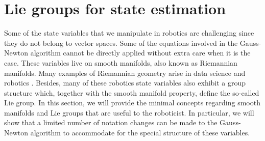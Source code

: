 \section{Lie groups for state estimation}
Some of the state variables that we manipulate in robotics are challenging since they do not belong to vector spaces. Some of the equations
involved in the Gauss-Newton algorithm cannot be directly applied without extra care when it is the case.
These variables live on smooth manifolds, also known as Riemannian manifolds. 
Many examples of Riemannian geometry arise in data science and robotics \cite{miolane2020geomstats}. 
Besides, many of these robotics state variables also exhibit a group structure which, together with the smooth manifold
property, define the so-called Lie group.
In this section, we will provide the minimal concepts regarding smooth manifolds and Lie groups that are useful to the roboticist. In particular, we will show 
that a limited number of notation changes can be made to the Gauss-Newton algorithm to accommodate for the special structure of these variables.



